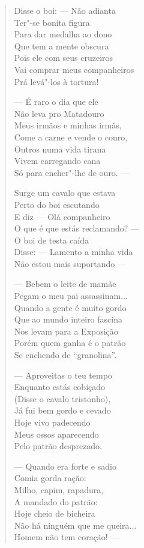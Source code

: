 \begin{verse}
Disse o boi: ---  Não adianta \\
Ter"-se bonita figura \\
Para dar medalha ao dono \\
Que tem a mente obscura \\
Pois ele com seus cruzeiros \\
Vai comprar meus companheiros \\
Prá levá"-los à tortura! 

---  É raro o dia que ele \\
Não leva pro Matadouro \\
Meus irmãos e minhas irmãs, \\
Come a carne e vende o couro, \\
Outros numa vida tirana \\
Vivem carregando cana \\
Só para encher"-lhe de ouro. ---

Surge um cavalo que estava \\
Perto do boi escutando \\
E diz ---  Olá companheiro \\
O que é que estás reclamando? --- \\
O boi de testa caída \\
Disse: ---  Lamento a minha vida \\
Não estou mais suportando ---  
\pagebreak

---  Bebem o leite de mamãe \\
Pegam o meu pai assassinam... \\
Quando a gente é muito gordo \\
Que ao mundo inteiro fascina \\
Nos levam para a Exposição \\
Porém quem ganha é o patrão \\
Se enchendo de ``granolina''. 

---  Aproveitas o teu tempo \\
Enquanto estás cobiçado \\
(Disse o cavalo tristonho), \\
Já fui bem gordo e cevado \\
Hoje vivo padecendo \\
Meus ossos aparecendo \\
Pelo patrão desprezado. 

---  Quando era forte e sadio \\
Comia gorda ração: \\
Milho, capim, rapadura, \\
A mandado do patrão: \\
Hoje cheio de bicheira \\
Não há ninguém que me queira... \\
Homem não tem coração! ---


\end{verse}
